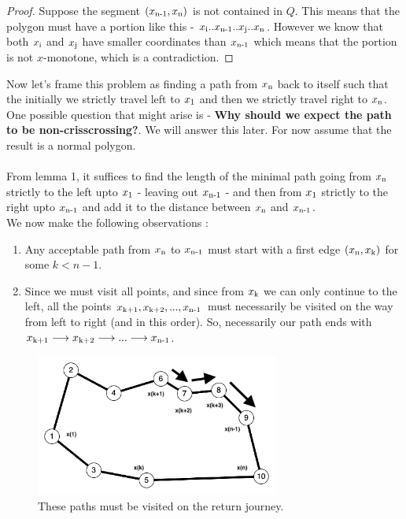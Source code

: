 \documentclass[12pt,letterpaper]{article}
\begin{document}
    \begin{proof}
        Suppose the segment $(x\textsubscript{n-1}, x\textsubscript{n})$ is not contained in $Q$. This means that the polygon must have a portion like this - $x\textsubscript{i}..x\textsubscript{n-1}..x\textsubscript{j}..x\textsubscript{n}$. However we know that both $x\textsubscript{i}$ and $x\textsubscript{j}$ have smaller coordinates than $x\textsubscript{n-1}$ which means that the portion is not $x$-monotone, which is a contradiction.
    \end{proof}

    Now let's frame this problem as finding a path from $x\textsubscript{n}$ back to itself such that the initially we strictly travel left to $x\textsubscript{1}$ and then we strictly travel right to $x\textsubscript{n}$. One possible question that might arise is - \textbf{Why should we expect the path to be non-crisscrossing?}. We will answer this later. For now assume that the result is a normal polygon.\\\\
    From lemma 1, it suffices to find the length of the minimal path going from $x\textsubscript{n}$ strictly to the left upto $x\textsubscript{1}$ - leaving out $x\textsubscript{n-1}$ - and then from $x\textsubscript{1}$ strictly to the right upto $x\textsubscript{n-1}$ and add it to the distance between $x\textsubscript{n}$ and $x\textsubscript{n-1}$. \\

    We now make the following observations :

    \begin{enumerate}
        \item Any acceptable path from $x\textsubscript{n}$ to $x\textsubscript{n-1}$ must start with a first edge $(x\textsubscript{n}, x\textsubscript{k})$ for some $k < n-1$.
        \item Since we must visit all points, and since from $x\textsubscript{k}$ we can only continue to the left, all the points $x\textsubscript{k+1}, x\textsubscript{k+2}, ... , x\textsubscript{n-1}$ must necessarily be visited on the way from left to right (and in this order). So, necessarily our path ends with $x\textsubscript{k+1}\longrightarrow x\textsubscript{k+2}\longrightarrow ... \longrightarrow x\textsubscript{n-1}$.
    \end{enumerate}

    \begin{figure}[htp]
    \centering
        \includegraphics[width=8cm]{TOCFctRDSbmtFSit.png}
            \caption{These paths must be visited on the return journey.}
        \label{fig:galaxy}
    \end{figure}
\end{document}
